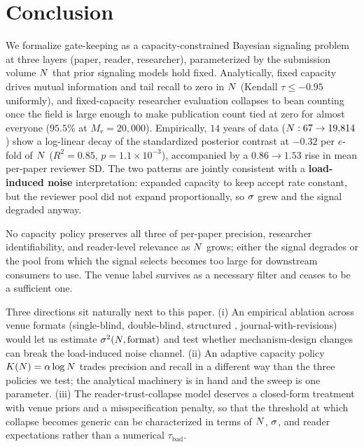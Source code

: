 \section{Conclusion}
\label{sec:conclusion}

We formalize gate-keeping as a capacity-constrained Bayesian signaling problem at three layers (paper, reader, researcher), parameterized by the submission volume $N$ that prior signaling models hold fixed. Analytically, fixed capacity drives mutual information and tail recall to zero in $N$ (Kendall $\tau \le -0.95$ uniformly), and fixed-capacity researcher evaluation collapses to bean counting once the field is large enough to make publication count tied at zero for almost everyone ($95.5\%$ at $M_r{=}20{,}000$). Empirically, $14$ years of \iclr data ($N: 67 \to 19{,}814$) show a log-linear decay of the standardized posterior contrast at $-0.32$ per $e$-fold of $N$ ($R^2 = 0.85$, $p = 1.1\times10^{-3}$), accompanied by a $0.86 \to 1.53$ rise in mean per-paper reviewer SD. The two patterns are jointly consistent with a {\bf load-induced noise} interpretation: \iclr expanded capacity to keep accept rate constant, but the reviewer pool did not expand proportionally, so $\sigma$ grew and the signal degraded anyway.

 No capacity policy preserves all three of per-paper precision, researcher identifiability, and reader-level relevance as $N$ grows; either the signal degrades or the pool from which the signal selects becomes too large for downstream consumers to use. The venue label survives as a necessary filter and ceases to be a sufficient one.

 Three directions sit naturally next to this paper. (i) An empirical ablation across venue formats (single-blind, double-blind, structured \openreview, journal-with-revisions) would let us estimate $\sigma^2(N, \text{format})$ and test whether mechanism-design changes can break the load-induced noise channel. (ii) An adaptive capacity policy $K(N) = \alpha \log N$ trades precision and recall in a different way than the three policies we test; the analytical machinery is in hand and the sweep is one parameter. (iii) The reader-trust-collapse model deserves a closed-form treatment with venue priors and a misspecification penalty, so that the threshold at which collapse becomes generic can be characterized in terms of $N$, $\sigma$, and reader expectations rather than a numerical $\tau_{\text{bad}}$.
